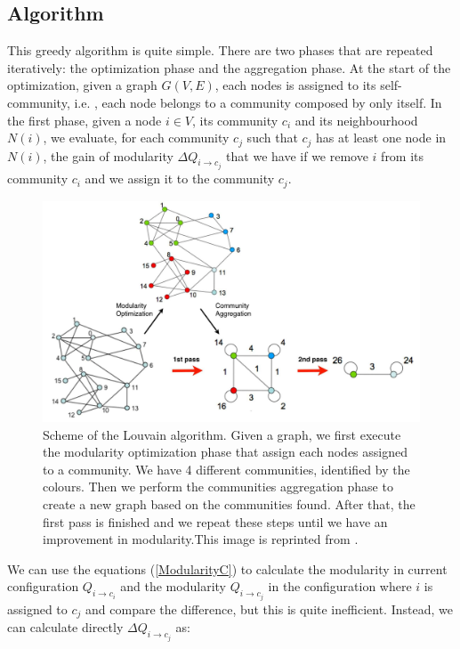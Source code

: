\subsection{Algorithm}
This greedy algorithm is quite simple. There are two phases that are repeated iteratively: the optimization phase and the aggregation phase. At the start of the optimization, given a graph $G(V,E)$, each nodes is assigned to its self-community, i.e. , each node belongs to a community composed by only itself. 
In the first phase, given a node $i\in V$, its community $c_i$ and its neighbourhood $N(i)$, we evaluate, for each community $c_j$ such that $c_j$ has at least one node in $N(i)$, the gain of modularity $\Delta Q_{i \rightarrow c_j}$ that we have if we remove $i$ from its community $c_i$ and we assign it to the community $c_j$. 
\begin{figure}[h]
	\centering
	\hspace*{-1em}
	\includegraphics[width=1\linewidth]{0-resources/blondel_scheme}
	\caption{Scheme of the Louvain algorithm. 
	 Given a graph, we first execute the modularity optimization phase that assign each nodes assigned to a community. We have 4 different communities, identified by the colours. Then we perform the communities aggregation phase to create a new graph based on the communities found. After that, the first pass is finished and we repeat these steps until we have an improvement in modularity.This image is reprinted from \cite{Blondel_2008}.}
	\label{fig:blondelscheme}
\end{figure}
We can use the equations (\ref{ModularityC}) to calculate the modularity in current configuration $Q_{i\rightarrow c_i}$ and the modularity $Q_{i\rightarrow c_j}$ in the configuration where $i$ is assigned to $c_j$ and compare the difference, but this is quite inefficient. Instead, we can calculate directly  $\Delta Q_{i \rightarrow c_j}$ as:
